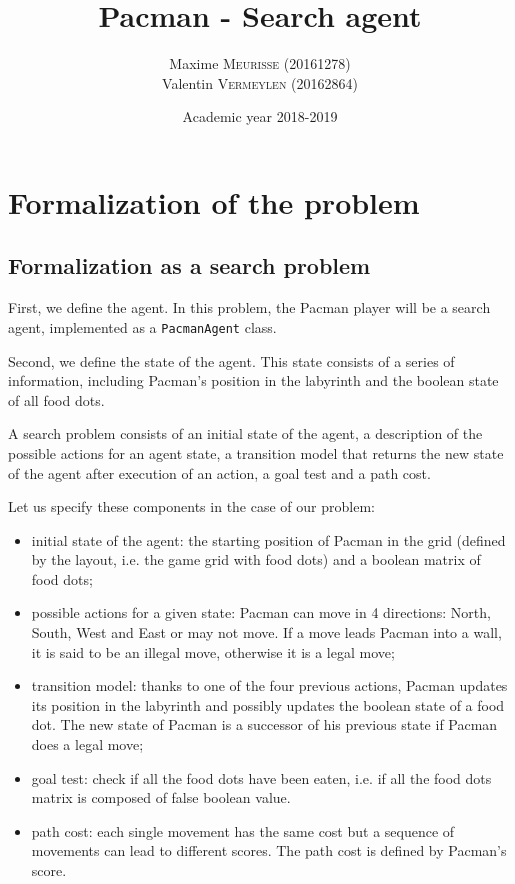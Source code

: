 \documentclass[a4paper, 12pt]{article}
\title{Pacman - Search agent}
\author{Maxime \textsc{Meurisse} (20161278)\\Valentin \textsc{Vermeylen} (20162864)\\}
\date{Academic year 2018-2019}
\begin{document}
    
	
	\section{Formalization of the problem}
	
	\subsection{Formalization as a search problem}
	First, we define the agent. In this problem, the Pacman player will be a search agent, implemented as a \texttt{PacmanAgent} class.\par
	
	Second, we define the state of the agent. This state consists of a series of information, including Pacman's position in the labyrinth and the boolean state of all food dots.\par
	
	A search problem consists of an initial state of the agent, a description of the possible actions for an agent state, a transition model that returns the new state of the agent after execution of an action, a goal test and a path cost.\par
	
	Let us specify these components in the case of our problem:
	\begin{itemize}
	    \item initial state of the agent: the starting position of Pacman in the grid (defined by the layout, i.e. the game grid with food dots) and a boolean matrix of food dots;
	    \item possible actions for a given state: Pacman can move in 4 directions: North, South, West and East or may not move. If a move leads Pacman into a wall, it is said to be an illegal move, otherwise it is a legal move;
	    \item transition model: thanks to one of the four previous actions, Pacman updates its position in the labyrinth and possibly updates the boolean state of a food dot. The new state of Pacman is a successor of his previous state if Pacman does a legal move;
	    \item goal test: check if all the food dots have been eaten, i.e. if all the food dots matrix is composed of false boolean value.
	    \item path cost: each single movement has the same cost but a sequence of movements can lead to different scores. The path cost is defined by Pacman's score.
	\end{itemize}
	
\end{document}
